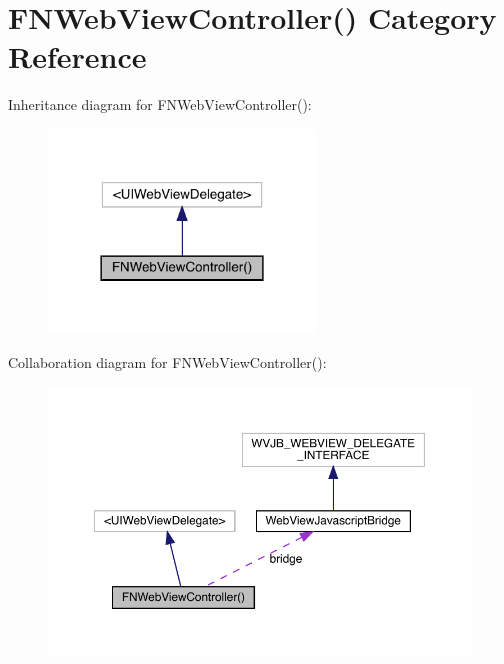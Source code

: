 \hypertarget{category_f_n_web_view_controller_07_08}{}\section{F\+N\+Web\+View\+Controller() Category Reference}
\label{category_f_n_web_view_controller_07_08}


Inheritance diagram for F\+N\+Web\+View\+Controller()\+:\nopagebreak
\begin{figure}[H]
\begin{center}
\leavevmode
\includegraphics[width=201pt]{category_f_n_web_view_controller_07_08__inherit__graph}
\end{center}
\end{figure}


Collaboration diagram for F\+N\+Web\+View\+Controller()\+:\nopagebreak
\begin{figure}[H]
\begin{center}
\leavevmode
\includegraphics[width=350pt]{category_f_n_web_view_controller_07_08__coll__graph}
\end{center}
\end{figure}

